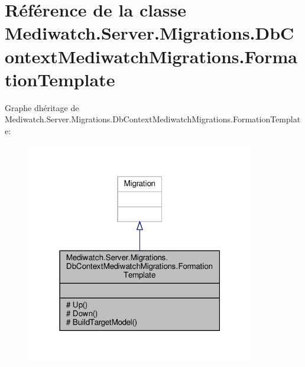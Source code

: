 \hypertarget{class_mediwatch_1_1_server_1_1_migrations_1_1_db_context_mediwatch_migrations_1_1_formation_template}{}\section{Référence de la classe Mediwatch.\+Server.\+Migrations.\+Db\+Context\+Mediwatch\+Migrations.\+Formation\+Template}
\label{class_mediwatch_1_1_server_1_1_migrations_1_1_db_context_mediwatch_migrations_1_1_formation_template}


Graphe d\textquotesingle{}héritage de Mediwatch.\+Server.\+Migrations.\+Db\+Context\+Mediwatch\+Migrations.\+Formation\+Template\+:\nopagebreak
\begin{figure}[H]
\begin{center}
\leavevmode
\includegraphics[width=283pt]{class_mediwatch_1_1_server_1_1_migrations_1_1_db_context_mediwatch_migrations_1_1_formation_template__inherit__graph}
\end{center}
\end{figure}


